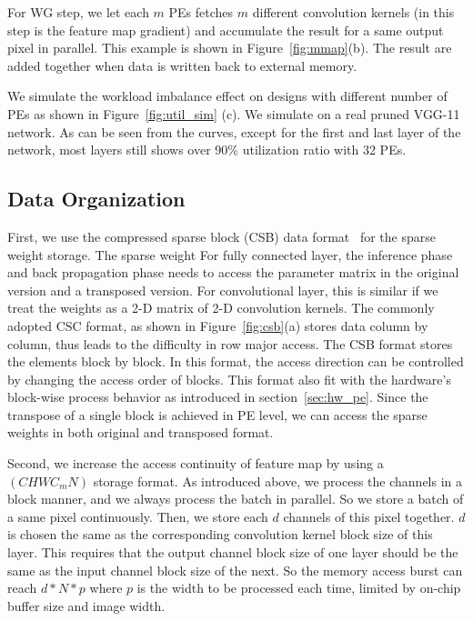 

For WG step, we let each $m$ PEs fetches $m$ different convolution kernels (in this step is the feature map gradient) and accumulate the result for a same output pixel in parallel. This example is shown in Figure~\ref{fig:mmap}(b). The result are added together when data is written back to external memory. 

We simulate the workload imbalance effect on designs with different number of PEs as shown in Figure~\ref{fig:util_sim} (c). We simulate on a real pruned VGG-11 network. As can be seen from the curves, except for the first and last layer of the network, most layers still shows over 90\% utilization ratio with 32 PEs.

\subsection{Data Organization}

First, we use the compressed sparse block (CSB) data format~\cite{bulucc2009parallel} for the sparse weight storage. The sparse weight For fully connected layer, the inference phase and back propagation phase needs to access the parameter matrix in the original version and a transposed version. For convolutional layer, this is similar if we treat the weights as a 2-D matrix of 2-D convolution kernels. The commonly adopted CSC format, as shown in Figure~\ref{fig:csb}(a) stores data column by column, thus leads to the difficulty in row major access. The CSB format stores the elements block by block. In this format, the access direction can be controlled by changing the access order of blocks. This format also fit with the hardware's block-wise process behavior as introduced in section~\ref{sec:hw_pe}. Since the transpose of a single block is achieved in PE level, we can access the sparse weights in both original and transposed format.

Second, we increase the access continuity of feature map by using a $(CHWC_mN)$ storage format. As introduced above, we process the channels in a block manner, and we always process the batch in parallel. So we store a batch of a same pixel continuously. Then, we store each $d$ channels of this pixel together. $d$ is chosen the same as the corresponding convolution kernel block size of this layer. This requires that the output channel block size of one layer should be the same as the input channel block size of the next. So the memory access burst can reach $d*N*p$ where $p$ is the width to be processed each time, limited by on-chip buffer size and image width. 

